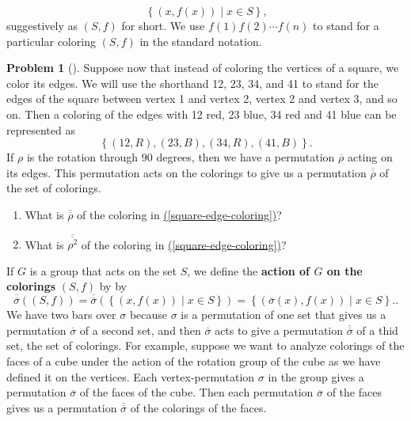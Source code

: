 \documentclass[10pt,]{book}
\newcommand{\terminology}[1]{\textbf{#1}}
\theoremstyle{plain}
\theoremstyle{definition}
\newtheorem{activity}[project]{Problem}
\theoremstyle{definition}
\numberwithin{equation}{chapter}
\begin{document}
\begin{equation*}
\left\{(x,f(x))\mid x\in S\right\}\text{,}
\end{equation*}
suggestively as \((S,f)\) for short. We use \(f(1)f(2)\cdots f(n)\) to stand for a particular coloring \((S,f)\) in the standard notation.%
\begin{activity}[]\marginsymbol[-1em]{} \label{activity-284}
\hypertarget{p-1616}{}%
Suppose now that instead of coloring the vertices of a square, we color its edges. We will use the shorthand 12, 23, 34, and 41 to stand for the edges of the square between vertex 1 and vertex 2, vertex 2 and vertex 3, and so on. Then a coloring of the edges with 12 red, 23 blue, 34 red and 41 blue can be represented as%
\begin{equation}
\left\{(12,R),(23,B),(34,R),(41,B)\right\}\text{.}\label{square-edge-coloring}
\end{equation}
If \(\rho\) is the rotation through 90 degrees, then we have a permutation \(\overline{\rho}\) acting on its edges. This permutation acts on the colorings to give us a permutation \(\overline{\overline{\rho}}\) of the set of colorings.%
\begin{enumerate}[font=\bfseries,label=(\alph*),ref=\alph*]
\item\label{task-212} \marginsymbol[-2.5em]{} \hypertarget{p-1617}{}%
What is \(\overline{\overline{\rho}}\) of the coloring in \hyperref[square-edge-coloring]{(\ref{square-edge-coloring})}?%
\item\label{task-213} \marginsymbol[-2.5em]{} \hypertarget{p-1619}{}%
What is \(\overline{\overline{\rho^2}}\) of the coloring in \hyperref[square-edge-coloring]{(\ref{square-edge-coloring})}?%
\end{enumerate}
\end{activity}
\hypertarget{p-1621}{}%
If \(G\) is a group that acts on the set \(S\), we define the \terminology{action of \(G\) on the colorings} \((S,f)\) by by%
\begin{equation}
\overline{\overline{\sigma}}((S,f))=\overline{\overline{\sigma}}\left(\left\{(x,f(x))\mid x\in S\right\}\right) = \left\{\left(\overline{\sigma}(x),f(x)\right)\mid x\in S\right\}.\text{.}\label{action-on-colorings}
\end{equation}
We have two bars over \(\sigma\) because \(\sigma\) is a permutation of one set that gives us a permutation \(\overline{\sigma}\) of a second set, and then \(\overline{\sigma}\) acts to give a permutation \(\overline{\overline{\sigma}}\) of a thid set, the set of colorings. For example, suppose we want to analyze colorings of the faces of a cube under the action of the rotation group of the cube as we have defined it on the vertices. Each vertex-permutation \(\sigma\) in the group gives a permutation \(\overline{\sigma}\) of the faces of the cube. Then each permutation \(\overline{\sigma}\) of the faces gives us a permutation \(\overline{\overline{\sigma}}\) of the colorings of the faces.%
\end{document}
